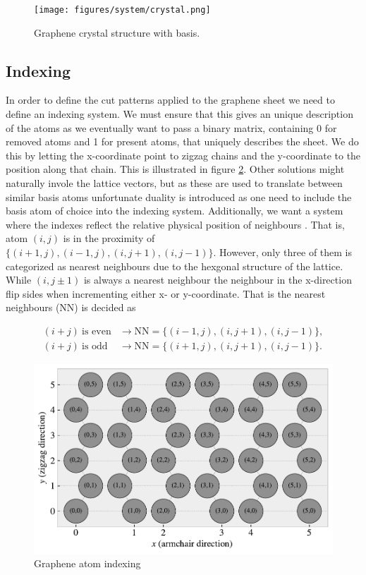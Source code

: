 \begin{figure}[H]
  \centering
  \texttt{[image: figures/system/crystal.png]}
  \caption{Graphene crystal structure with basis.}
  \label{fig:graphene_crystal}
\end{figure}



\subsection{Indexing}
In order to define the cut patterns applied to the graphene sheet we need to
define an indexing system. We must ensure that this gives an unique description
of the atoms as we eventually want to pass a binary matrix, containing 0 for
removed atoms and 1 for present atoms, that uniquely describes the sheet. We do
this by letting the x-coordinate point to zigzag chains and the y-coordinate to
the position along that chain. This is illustrated in figure
\ref{fig:atom_indexing}. Other solutions might naturally invole the lattice
vectors, but as these are used to translate between similar basis atoms
unfortunate duality is introduced as one need to include the basis atom of
choice into the indexing system. Additionally, we want a system where the
indexes reflect the relative physical position of neighbours . That is, atom
$(i, j)$ is in the proximity of $\{(i+1, j), (i-1, j), (i, j+1), (i, j-1)\}$.
However, only three of them is categorized as nearest neighbours due to the
hexgonal structure of the lattice. While $(i, j\pm 1)$ is always a nearest
neighbour the neighbour in the x-direction flip sides when incrementing either
x- or y-coordinate. That is the nearest neighbours (NN) is decided as

\begin{align*}
  (i + j) \ \text{is even} &\rightarrow \text{NN} = \{(i-1, j), (i, j+1), (i, j-1)\}, \\
  (i + j) \ \text{is odd} &\rightarrow \text{NN} = \{(i+1, j), (i, j+1), (i, j-1)\}.
\end{align*}


\begin{figure}[H]
  \centering
  \includegraphics[width=0.7\linewidth]{figures/system/atom_indexing.pdf}
  \caption{Graphene atom indexing}
  \label{fig:atom_indexing}
\end{figure}



